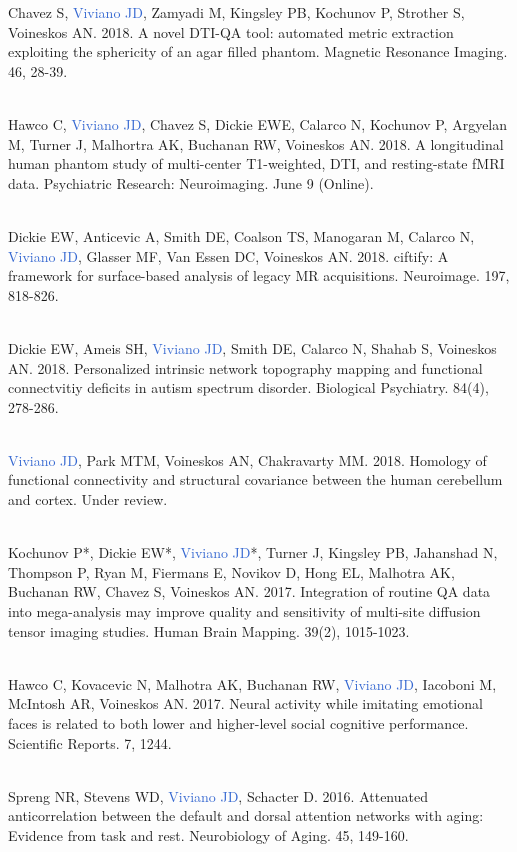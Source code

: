\documentclass[a4paper,11pt,oneside]{book}
\begin{document}
\begin{flushleft}
Chavez S, \textcolor{highlight}{Viviano JD}, Zamyadi M, Kingsley PB, Kochunov P, Strother S, Voineskos AN. 2018. A novel DTI-QA tool: automated metric extraction exploiting the sphericity of an agar filled phantom. Magnetic Resonance Imaging. 46, 28-39. \\\

Hawco C, \textcolor{highlight}{Viviano JD}, Chavez S, Dickie EWE, Calarco N, Kochunov P, Argyelan M, Turner J, Malhortra AK, Buchanan RW, Voineskos AN. 2018. A longitudinal human phantom study of multi-center T1-weighted, DTI, and resting-state fMRI data. Psychiatric Research: Neuroimaging. June 9 (Online).  \\\

Dickie EW, Anticevic A, Smith DE, Coalson TS, Manogaran M, Calarco N, \textcolor{highlight}{Viviano JD}, Glasser MF, Van Essen DC, Voineskos AN. 2018. ciftify: A framework for surface-based analysis of legacy MR acquisitions. Neuroimage. 197, 818-826. \\\

Dickie EW, Ameis SH, \textcolor{highlight}{Viviano JD}, Smith DE, Calarco N, Shahab S, Voineskos AN. 2018. Personalized intrinsic network topography mapping and functional connectvitiy deficits in autism spectrum disorder. Biological Psychiatry. 84(4), 278-286. \\\

\textcolor{highlight}{Viviano JD}, Park MTM, Voineskos AN, Chakravarty MM. 2018. Homology of functional connectivity and structural covariance between the human cerebellum and cortex. Under review. \\\

Kochunov P*, Dickie EW*, \textcolor{highlight}{Viviano JD}*, Turner J, Kingsley PB, Jahanshad N, Thompson P, Ryan M, Fiermans E, Novikov D, Hong EL, Malhotra AK, Buchanan RW, Chavez S, Voineskos AN. 2017. Integration of routine QA data into mega-analysis may improve quality and sensitivity of multi-site diffusion tensor imaging studies. Human Brain Mapping. 39(2), 1015-1023. \\\

Hawco C, Kovacevic N, Malhotra AK, Buchanan RW, \textcolor{highlight}{Viviano JD}, Iacoboni M, McIntosh AR, Voineskos AN. 2017. Neural activity while imitating emotional faces is related to both lower and higher-level social cognitive performance. Scientific Reports. 7, 1244. \\\

Spreng NR, Stevens WD, \textcolor{highlight}{Viviano JD}, Schacter D. 2016. Attenuated anticorrelation between the default and dorsal attention networks with aging: Evidence from task and rest. Neurobiology of Aging. 45, 149-160. \\\


\end{flushleft}
\end{document}
